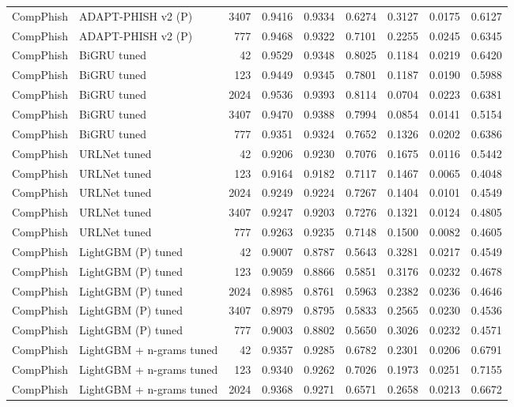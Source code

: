 \begin{table}[t]
\begin{tabular}{llrrrrrrr}
CompPhish & ADAPT-PHISH v2 (P) & 3407 & 0.9416 & 0.9334 & 0.6274 & 0.3127 & 0.0175 & 0.6127 \\
CompPhish & ADAPT-PHISH v2 (P) & 777 & 0.9468 & 0.9322 & 0.7101 & 0.2255 & 0.0245 & 0.6345 \\
CompPhish & BiGRU tuned & 42 & 0.9529 & 0.9348 & 0.8025 & 0.1184 & 0.0219 & 0.6420 \\
CompPhish & BiGRU tuned & 123 & 0.9449 & 0.9345 & 0.7801 & 0.1187 & 0.0190 & 0.5988 \\
CompPhish & BiGRU tuned & 2024 & 0.9536 & 0.9393 & 0.8114 & 0.0704 & 0.0223 & 0.6381 \\
CompPhish & BiGRU tuned & 3407 & 0.9470 & 0.9388 & 0.7994 & 0.0854 & 0.0141 & 0.5154 \\
CompPhish & BiGRU tuned & 777 & 0.9351 & 0.9324 & 0.7652 & 0.1326 & 0.0202 & 0.6386 \\
CompPhish & URLNet tuned & 42 & 0.9206 & 0.9230 & 0.7076 & 0.1675 & 0.0116 & 0.5442 \\
CompPhish & URLNet tuned & 123 & 0.9164 & 0.9182 & 0.7117 & 0.1467 & 0.0065 & 0.4048 \\
CompPhish & URLNet tuned & 2024 & 0.9249 & 0.9224 & 0.7267 & 0.1404 & 0.0101 & 0.4549 \\
CompPhish & URLNet tuned & 3407 & 0.9247 & 0.9203 & 0.7276 & 0.1321 & 0.0124 & 0.4805 \\
CompPhish & URLNet tuned & 777 & 0.9263 & 0.9235 & 0.7148 & 0.1500 & 0.0082 & 0.4605 \\
CompPhish & LightGBM (P) tuned & 42 & 0.9007 & 0.8787 & 0.5643 & 0.3281 & 0.0217 & 0.4549 \\
CompPhish & LightGBM (P) tuned & 123 & 0.9059 & 0.8866 & 0.5851 & 0.3176 & 0.0232 & 0.4678 \\
CompPhish & LightGBM (P) tuned & 2024 & 0.8985 & 0.8761 & 0.5963 & 0.2382 & 0.0236 & 0.4646 \\
CompPhish & LightGBM (P) tuned & 3407 & 0.8979 & 0.8795 & 0.5833 & 0.2565 & 0.0230 & 0.4536 \\
CompPhish & LightGBM (P) tuned & 777 & 0.9003 & 0.8802 & 0.5650 & 0.3026 & 0.0232 & 0.4571 \\
CompPhish & LightGBM + n-grams tuned & 42 & 0.9357 & 0.9285 & 0.6782 & 0.2301 & 0.0206 & 0.6791 \\
CompPhish & LightGBM + n-grams tuned & 123 & 0.9340 & 0.9262 & 0.7026 & 0.1973 & 0.0251 & 0.7155 \\
CompPhish & LightGBM + n-grams tuned & 2024 & 0.9368 & 0.9271 & 0.6571 & 0.2658 & 0.0213 & 0.6672 \\

\end{tabular}
\end{table}
